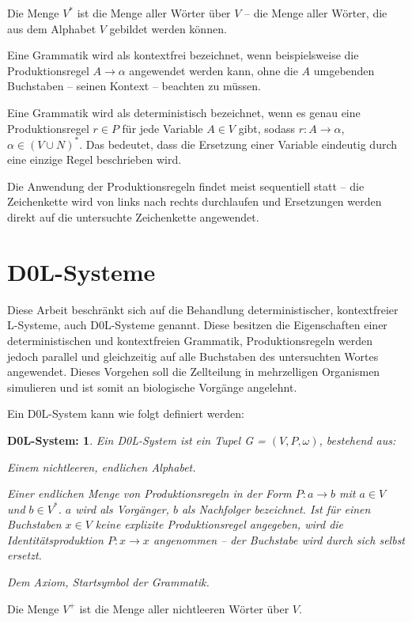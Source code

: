 Die Menge $V^*$ ist die Menge aller Wörter über $V$ -- die Menge aller Wörter, die aus dem Alphabet $V$ gebildet werden können. \cite[S.70]{ThI:14} 

Eine Grammatik wird als kontextfrei bezeichnet, wenn beispielsweise die Produktionsregel $A \rightarrow \alpha$ angewendet werden kann, ohne die $A$ umgebenden Buchstaben -- seinen Kontext -- beachten zu müssen. \cite[S.343]{ThI:14} 

Eine Grammatik wird als deterministisch bezeichnet, wenn es genau eine Produktionsregel $r \in P$ für jede Variable $A \in V$ gibt, sodass $r: A \rightarrow \alpha$, $\alpha \in (V \cup N )^*$. Das bedeutet, dass die Ersetzung einer Variable eindeutig durch eine einzige Regel beschrieben wird. \cite[S.75]{PCGiG:16}

Die Anwendung der Produktionsregeln findet meist sequentiell statt -- die Zeichenkette wird von links nach rechts durchlaufen und Ersetzungen werden direkt auf die untersuchte Zeichenkette angewendet. \cite[S.75]{PCGiG:16}

\section{D0L-Systeme}

Diese Arbeit beschränkt sich auf die Behandlung deterministischer, kontextfreier L-Systeme, auch D0L-Systeme genannt. Diese besitzen die Eigenschaften einer deterministischen und kontextfreien Grammatik, Produktionsregeln werden jedoch parallel und gleichzeitig auf alle Buchstaben des untersuchten Wortes angewendet. Dieses Vorgehen soll die Zellteilung in mehrzelligen Organismen simulieren und ist somit an biologische Vorgänge angelehnt. \cite[S. 3]{ABOP:04} 

Ein D0L-System kann wie folgt definiert werden:
\newtheorem{defD0LSystem}{D0L-System:}[chapter]
\begin{defD0LSystem}
	Ein D0L-System ist ein Tupel G = $(V, P, \omega)$, bestehend aus:
	
	\begin{description}[labelindent]
		\item[\boldmath$V$] Einem nichtleeren, endlichen Alphabet.\\
		
		\item[\boldmath$P$] Einer endlichen Menge von Produktionsregeln in der Form $P: a \rightarrow b$ mit $a \in V$ und $b \in V^*$. $a$ wird als Vorgänger, $b$ als Nachfolger bezeichnet. Ist für einen Buchstaben $x \in V$ keine explizite Produktionsregel angegeben, wird die Identitätsproduktion $P: x \rightarrow x$ angenommen -- der Buchstabe wird durch sich selbst ersetzt.\\
		
		\item[\boldmath$\omega \in V^+$]  Dem Axiom, Startsymbol der Grammatik.		
	\end{description}
\cite[S.4]{ABOP:04} 
\end{defD0LSystem}
Die Menge $V^+$ ist die Menge aller nichtleeren Wörter über $V$.  

